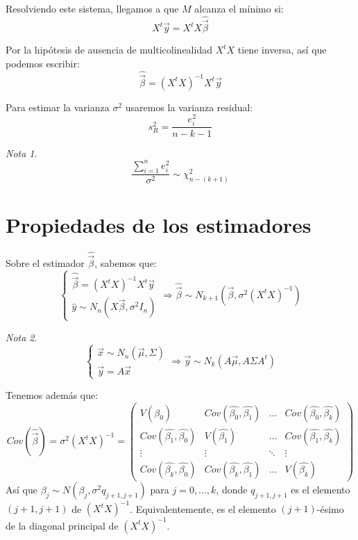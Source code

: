 \documentclass{report}
\theoremstyle{remark}
\theoremstyle{remark}
\newtheorem*{note}{Nota}
\theoremstyle{remark}
\theoremstyle{definition}
\theoremstyle{definition}
\theoremstyle{definition}
\begin{document}
Resolviendo este sistema, llegamos a que $M$ alcanza el mínimo si:
$$X^t\vec{y} = X^tX\hat{\vec{\beta}}$$

Por la hipótesis de ausencia de multicolinealidad $X^tX$ tiene inversa, así que podemos escribir:
$$\hat{\vec{\beta}} = (X^tX)^{-1}X^t\vec{y}$$

Para estimar la varianza $\sigma^2$ usaremos la varianza residual:
$$s_R^2 = \frac{e_i^2}{n-k-1}$$

\begin{note}
    $$\frac{\sum_{i=1}^n e_i^2}{\sigma^2} \sim \chi^2_{n-(k+1)}$$
\end{note}

\section{Propiedades de los estimadores}
Sobre el estimador $\hat{\vec{\beta}}$, sabemos que:
$$\begin{cases}
        \hat{\vec{\beta}} = (X^tX)^{-1}X^t\vec{y} \\
        \hat{y} \sim N_n(X\vec{\beta}, \sigma^2 I_n)
    \end{cases} \Rightarrow \hat{\vec{\beta}} \sim N_{k+1}(\vec{\beta}, \sigma^2(X^tX)^{-1})$$

\begin{note}
    $$\begin{cases}
            \vec{x} \sim N_n(\vec{\mu}, \Sigma) \\
            \vec{y} = A\vec{x}
        \end{cases} \Rightarrow \vec{y} \sim N_k(A\vec{\mu}, A\Sigma A^t)$$
\end{note}

Tenemos además que:
$$Cov(\hat{\vec{\beta}}) = \sigma^2(X^tX)^{-1} = \begin{pmatrix}
        V(\hat{\beta_0})                  & Cov(\hat{\beta_0}, \hat{\beta_1}) & \dots  & Cov(\hat{\beta_0}, \hat{\beta_k}) \\
        Cov(\hat{\beta_1}, \hat{\beta_0}) & V(\hat{\beta_1})                  & \dots  & Cov(\hat{\beta_1}, \hat{\beta_k}) \\
        \vdots                            & \vdots                            & \ddots & \vdots                            \\
        Cov(\hat{\beta_k}, \hat{\beta_0}) & Cov(\hat{\beta_k}, \hat{\beta_1}) & \dots  & V(\hat{\beta_k})
    \end{pmatrix}$$
Así que $\hat{\beta_j} \sim N(\beta_j, \sigma^2 q_{j+1, j+1})$ para $j = 0, \dots, k$, donde $q_{j+1, j+1}$ es el elemento $(j+1, j+1)$ de $(X^tX)^{-1}$.
Equivalentemente, es el elemento $(j+1)$-ésimo de la diagonal principal de $(X^tX)^{-1}$.
\end{document}
